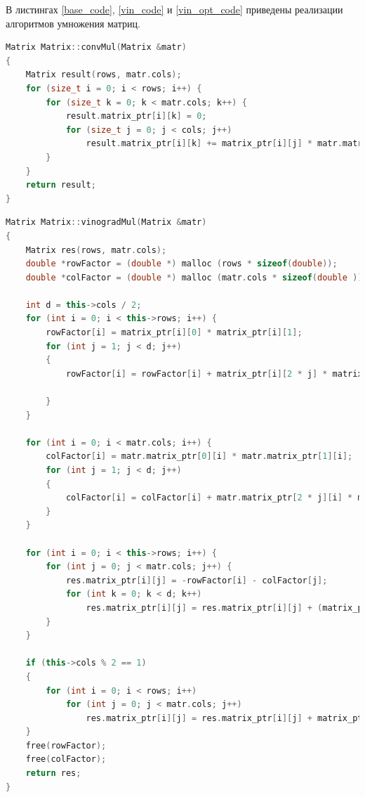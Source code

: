 \documentclass[12pt]{report}
\begin{document}
В листингах \ref{base_code}, \ref{vin_code} и \ref{vin_opt_code} приведены реализации алгоритмов умножения матриц.
\begin{lstlisting}[label=base_code,caption=Функция обычного алгоритма умножения матриц,language=C++]
Matrix Matrix::convMul(Matrix &matr)
{
    Matrix result(rows, matr.cols);
    for (size_t i = 0; i < rows; i++) {
        for (size_t k = 0; k < matr.cols; k++) {
            result.matrix_ptr[i][k] = 0;
            for (size_t j = 0; j < cols; j++)
                result.matrix_ptr[i][k] += matrix_ptr[i][j] * matr.matrix_ptr[j][k];
        }
    }
    return result;
}
\end{lstlisting}
\newpage
\begin{lstlisting}[label=vin_code,caption=Функция алгоритма умножения матриц Винограда,language=C++]
Matrix Matrix::vinogradMul(Matrix &matr)
{
    Matrix res(rows, matr.cols);
    double *rowFactor = (double *) malloc (rows * sizeof(double));
    double *colFactor = (double *) malloc (matr.cols * sizeof(double ));

    int d = this->cols / 2;
    for (int i = 0; i < this->rows; i++) {
        rowFactor[i] = matrix_ptr[i][0] * matrix_ptr[i][1];
        for (int j = 1; j < d; j++)
        {
            rowFactor[i] = rowFactor[i] + matrix_ptr[i][2 * j] * matrix_ptr[i][2 * j + 1];

        }
    }

    for (int i = 0; i < matr.cols; i++) {
        colFactor[i] = matr.matrix_ptr[0][i] * matr.matrix_ptr[1][i];
        for (int j = 1; j < d; j++)
        {
            colFactor[i] = colFactor[i] + matr.matrix_ptr[2 * j][i] * matr.matrix_ptr[2 * j + 1][i];
        }
    }

    for (int i = 0; i < this->rows; i++) {
        for (int j = 0; j < matr.cols; j++) {
            res.matrix_ptr[i][j] = -rowFactor[i] - colFactor[j];
            for (int k = 0; k < d; k++)
                res.matrix_ptr[i][j] = res.matrix_ptr[i][j] + (matrix_ptr[i][2 * k] + matr.matrix_ptr[2 * k + 1][j]) * (matrix_ptr[i][2 * k + 1] + matr.matrix_ptr[2 * k][j]);
        }
    }

    if (this->cols % 2 == 1)
    {
        for (int i = 0; i < rows; i++)
            for (int j = 0; j < matr.cols; j++)
                res.matrix_ptr[i][j] = res.matrix_ptr[i][j] + matrix_ptr[i][this->cols - 1] * matr.matrix_ptr[this->cols - 1][j];
    }
    free(rowFactor);
    free(colFactor);
    return res;
}
\end{lstlisting}
\newpage
\end{document}
